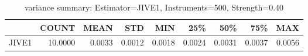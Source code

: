 \begin{table}[ht]
\centering
\caption{variance summary: Estimator=JIVE1, Instruments=500, Strength=0.40}
\begin{tabular}{lrrrrrrrr}
\toprule
 & COUNT & MEAN & STD & MIN & 25\% & 50\% & 75\% & MAX \\
\midrule
JIVE1 & 10.0000 & 0.0033 & 0.0012 & 0.0018 & 0.0024 & 0.0031 & 0.0037 & 0.0056 \\
\bottomrule
\end{tabular}
\end{table}
